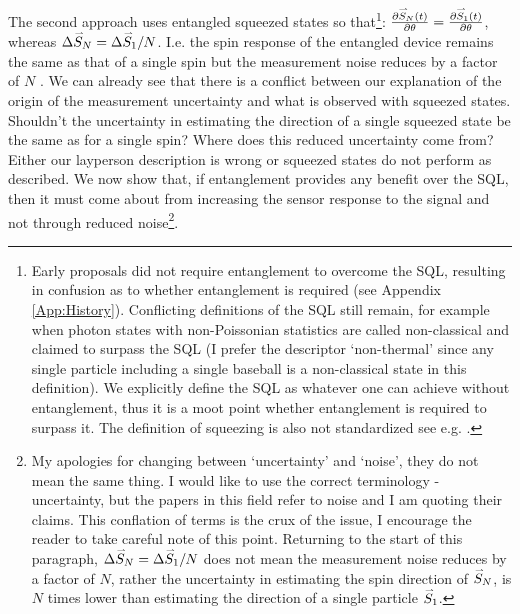 \documentclass[reqno]{amsart}
\newcommand{\myvec}[1]{\accentset{\rightharpoonup}{#1}}
\begin{document}
The second approach uses entangled squeezed states so that\footnote{Early proposals did not require entanglement to overcome the SQL, resulting in confusion as to whether entanglement is required (see Appendix\,\ref{App:History}). Conflicting definitions of the SQL still remain, for example when photon states with non-Poissonian statistics are called non-classical and claimed to surpass the SQL (I prefer the descriptor `non-thermal' since any single particle including a single baseball is a non-classical state in this definition). We explicitly define the SQL as whatever one can achieve without entanglement, thus it is a moot point whether entanglement is required to surpass it. The definition of squeezing is also not standardized see e.g. \cite{Soerensen2001,Meyer2001,Maccone2020}.}: $\frac{\partial \myvec{S}_N(t)}{\partial \theta} = \frac{\partial \myvec{S}_1(t)}{\partial \theta}$, whereas $\Delta \myvec{S}_N = \Delta \myvec{S}_1/N$. I.e. the spin response of the entangled device remains the same as that of a single spin but the measurement noise reduces by a factor of $N$ \cite{Caves1981, Ma2011, Pezze2018, Gross2012, Ludlow2015, Walls1983, Wodkiewicz1985, Wu1986, Slusher1987, Xiao1987, Polzik1992, Wineland1992, Kitagawa1993, Wineland1994, Sanders1995, Kuzmich1998, Soerensen1998, Brif1999, Kuzmich2000, Meyer2001, Esteve2008, Appel2009, Eberle2010, Gross2010, Koschorreck2010, Koschorreck2010a, Leroux2010, Leroux2010a, LouchetChauvet2010, SchleierSmith2010, Wasilewski2010, Luecke2011, Sewell2012, Aasi2013, Taylor2013, Bohnet2014, Muessel2014, Strobel2014, Kruse2016, Polzik2016, Cox2016, Davis2016, Bohnet2016, Hosten2016, Linnemann2016, Macri2016, Tse2019, Braverman2019, Schulte2020, Malia2020, Bao2020, PedrozoPenafiel2020, Casacio2021, Gilmore2021, Greve2022, Malia2022}. We can already see that there is a conflict between our explanation of the origin of the measurement uncertainty and what is observed with squeezed states. Shouldn't the uncertainty in estimating the direction of a single squeezed state be the same as for a single spin? Where does this reduced uncertainty come from? Either our layperson description is wrong or squeezed states do not perform as described. We now show that, if entanglement provides any benefit over the SQL, then it must come about from increasing the sensor response to the signal and not through reduced noise\footnote{My apologies for changing between `uncertainty' and `noise', they do not mean the same thing. I would like to use the correct terminology - uncertainty, but the papers in this field refer to noise and I am quoting their claims. This conflation of terms is the crux of the issue, I encourage the reader to take careful note of this point. Returning to the start of this paragraph, $\Delta \myvec{S}_N = \Delta \myvec{S}_1/N$ does not mean the measurement noise reduces by a factor of $N$, rather the uncertainty in estimating the spin direction of $\myvec{S}_N$, is $N$ times lower than estimating the direction of a single particle $\myvec{S}_1$.}.\\
\end{document}
